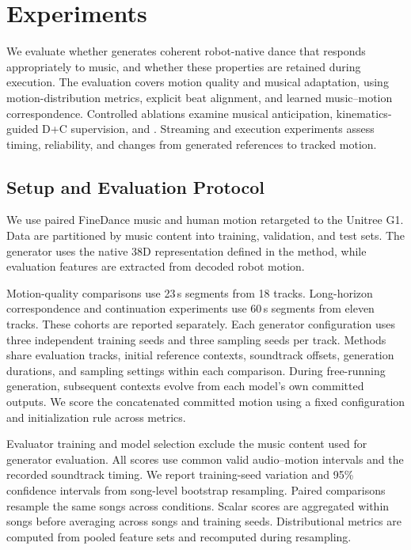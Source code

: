 \section{Experiments}
\label{sec:experiments}

We evaluate whether \method{} generates coherent robot-native
dance that responds appropriately to music, and whether these
properties are retained during execution.
The evaluation covers motion quality and musical adaptation,
using motion-distribution metrics, explicit beat alignment,
and learned music--motion correspondence.
Controlled ablations examine musical anticipation,
kinematics-guided D+C supervision, and \cof{}.
Streaming and execution experiments assess timing,
reliability, and changes from generated references
to tracked motion.

\subsection{Setup and Evaluation Protocol}
\label{sec:experimental_setup}
\label{sec:evaluation_protocol}

We use paired FineDance music and human motion retargeted
to the Unitree G1.
Data are partitioned by music content into training,
validation, and test sets.
The generator uses the native 38D representation defined
in the method, while evaluation features are extracted
from decoded robot motion.

Motion-quality comparisons use 23\,s segments from
18 tracks.
Long-horizon correspondence and continuation experiments
use 60\,s segments from eleven tracks.
These cohorts are reported separately.
Each generator configuration uses three independent
training seeds and three sampling seeds per track.
Methods share evaluation tracks, initial reference contexts,
soundtrack offsets, generation durations, and sampling
settings within each comparison.
During free-running generation, subsequent contexts evolve
from each model's own committed outputs.
We score the concatenated committed motion using a fixed
configuration and initialization rule across metrics.

Evaluator training and model selection exclude the music
content used for generator evaluation.
All scores use common valid audio--motion intervals and
the recorded soundtrack timing.
We report training-seed variation and 95\% confidence
intervals from song-level bootstrap resampling.
Paired comparisons resample the same songs across conditions.
Scalar scores are aggregated within songs before averaging
across songs and training seeds.
Distributional metrics are computed from pooled feature
sets and recomputed during resampling.


